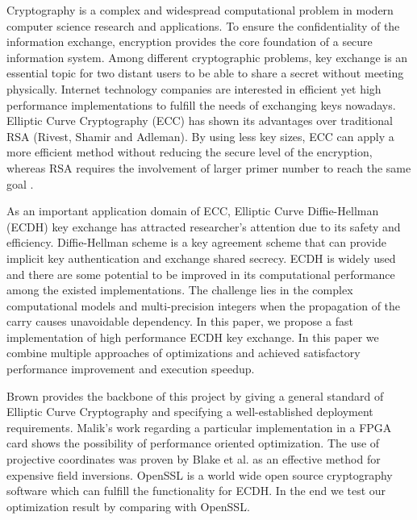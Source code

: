 Cryptography is a complex and widespread computational problem in modern computer science research and applications. To ensure the confidentiality of the information exchange, encryption provides the core foundation of a secure information system. Among different cryptographic problems, key exchange is an essential topic for two distant users to be able to share a secret without meeting physically. Internet technology companies are interested in efficient yet high performance implementations to fulfill the needs of exchanging keys nowadays. Elliptic Curve Cryptography (ECC) has shown its advantages over traditional RSA (Rivest, Shamir and Adleman). By using less key sizes, ECC can apply a more efficient method without reducing the secure level of the encryption, whereas RSA requires the involvement of larger primer number to reach the same goal \cite{Malik:2010}.

As an important application domain of ECC, Elliptic Curve Diffie-Hellman (ECDH) key exchange has attracted researcher's attention due to its safety and efficiency. Diffie-Hellman scheme is a key agreement scheme that can provide implicit key authentication\cite{Brown:2009} and exchange shared secrecy. ECDH is widely used and there are some potential to be improved in its computational performance among the existed implementations. The challenge lies in the complex computational models and multi-precision integers when the propagation of the carry causes unavoidable dependency. In this paper, we propose a fast implementation of high performance ECDH key exchange. In this paper we combine multiple approaches of optimizations and achieved satisfactory performance improvement and execution speedup.

Brown provides the backbone of this project by giving a general standard of Elliptic Curve Cryptography\cite{Brown:2009} and specifying a well-established deployment requirements\cite{Brown:2010}. Malik's work regarding a particular implementation in a FPGA card \cite{Malik:2010} shows the possibility of performance oriented optimization. The use of projective coordinates was proven by Blake et al.\cite{Blake:1999} as an effective method for expensive field inversions. OpenSSL is a world wide open source cryptography software which can fulfill the functionality for ECDH\cite{Emilia:2011}. In the end we test our optimization result by comparing with OpenSSL.